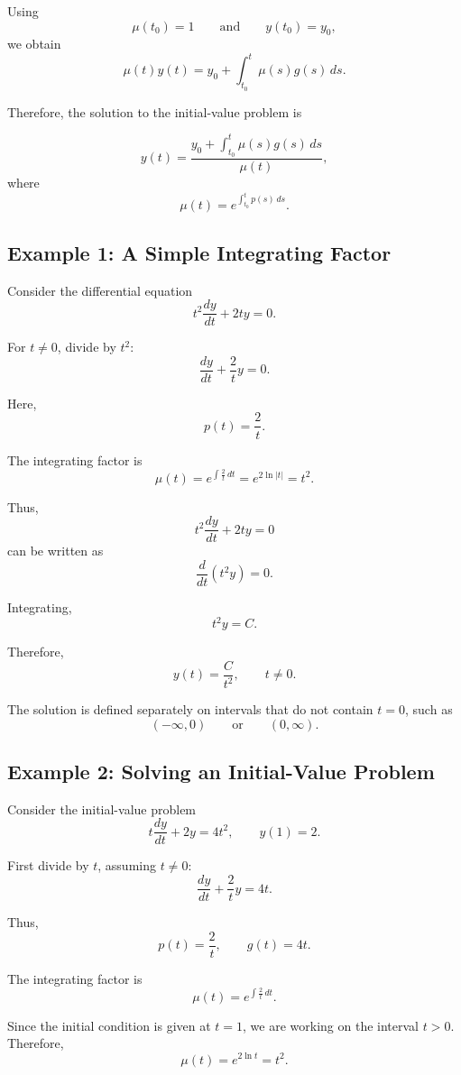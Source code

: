 \documentclass[11pt]{article}
\begin{document}
Using
\[
\mu(t_0)=1
\qquad\text{and}\qquad
y(t_0)=y_0,
\]
we obtain
\[
\mu(t)y(t)
=
y_0+\int_{t_0}^{t}\mu(s)g(s)\,ds.
\]

Therefore, the solution to the initial-value problem is

\[
\boxed{
y(t)
=
\frac{
\displaystyle
y_0+
\int_{t_0}^{t}\mu(s)g(s)\,ds
}{
\mu(t)
}
},
\]
where
\[
\boxed{
\mu(t)
=
e^{\int_{t_0}^{t}p(s)\,ds}
}.
\]

\subsection{Example 1: A Simple Integrating Factor}

Consider the differential equation
\[
t^2\frac{dy}{dt}+2ty=0.
\]

For \(t\neq 0\), divide by \(t^2\):
\[
\frac{dy}{dt}+\frac{2}{t}y=0.
\]

Here,
\[
p(t)=\frac{2}{t}.
\]

The integrating factor is
\[
\mu(t)
=
e^{\int \frac{2}{t}\,dt}
=
e^{2\ln|t|}
=
t^2.
\]

Thus,
\[
t^2\frac{dy}{dt}+2ty=0
\]
can be written as
\[
\frac{d}{dt}\left(t^2y\right)=0.
\]

Integrating,
\[
t^2y=C.
\]

Therefore,
\[
\boxed{
y(t)=\frac{C}{t^2}
},
\qquad t\neq 0.
\]

The solution is defined separately on intervals that do not contain
\(t=0\), such as
\[
(-\infty,0)
\qquad\text{or}\qquad
(0,\infty).
\]

\subsection{Example 2: Solving an Initial-Value Problem}

Consider the initial-value problem
\[
t\frac{dy}{dt}+2y=4t^2,
\qquad
y(1)=2.
\]

First divide by \(t\), assuming \(t\neq 0\):
\[
\frac{dy}{dt}+\frac{2}{t}y=4t.
\]

Thus,
\[
p(t)=\frac{2}{t},
\qquad
g(t)=4t.
\]

The integrating factor is
\[
\mu(t)
=
e^{\int \frac{2}{t}\,dt}.
\]

Since the initial condition is given at \(t=1\), we are working on the
interval \(t>0\). Therefore,
\[
\mu(t)
=
e^{2\ln t}
=
t^2.
\]
\end{document}

